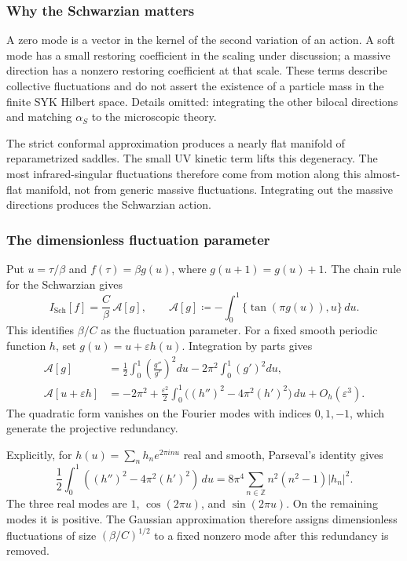 \documentclass[11pt]{article}
\numberwithin{equation}{section}
\theoremstyle{exposition}
\theoremstyle{result}
\newcommand{\Sch}{\mathrm{Sch}}
\begin{document}
\subsubsection{Why the Schwarzian matters}


A zero mode is a vector in the kernel of the second variation of an action. A soft mode has a small restoring coefficient in the scaling under discussion; a massive direction has a nonzero restoring coefficient at that scale. These terms describe collective fluctuations and do not assert the existence of a particle mass in the finite SYK Hilbert space. Details omitted: integrating the other bilocal directions and matching $\alpha_S$ to the microscopic theory.

The strict conformal approximation produces a nearly flat manifold of reparametrized saddles. The small UV kinetic term lifts this degeneracy. The most infrared-singular fluctuations therefore come from motion along this almost-flat manifold, not from generic massive fluctuations. Integrating out the massive directions produces the Schwarzian action.

\subsubsection{The dimensionless fluctuation parameter}
Put $u=\tau/\beta$ and $f(\tau)=\beta g(u)$, where $g(u+1)=g(u)+1$. The chain rule for the Schwarzian gives
\begin{equation}
I_{\Sch}[f]=\frac C\beta\,\mathcal A[g],
\qquad
\mathcal A[g]\coloneqq -\int_0^1\{\tan(\pi g(u)),u\}\,du.
\label{eq:SchRescaled}
\end{equation}
This identifies $\beta/C$ as the fluctuation parameter. For a fixed smooth periodic function $h$, set $g(u)=u+\varepsilon h(u)$. Integration by parts gives
\begin{align*}
\mathcal A[g]
&=\frac12\int_0^1\left(\frac{g''}{g'}\right)^2du
-2\pi^2\int_0^1(g')^2du,\\
\mathcal A[u+\varepsilon h]
&=-2\pi^2+\frac{\varepsilon^2}{2}
\int_0^1\bigl((h'')^2-4\pi^2(h')^2\bigr)\,du
+O_h(\varepsilon^3).
\end{align*}
The quadratic form vanishes on the Fourier modes with indices $0,1,-1$, which generate the projective redundancy.


Explicitly, for $h(u)=\sum_n h_ne^{2\pi inu}$ real and smooth, Parseval's identity gives
\begin{equation*}
\frac12\int_0^1((h'')^2-4\pi^2(h')^2)\,du
=8\pi^4\sum_{n\in\mathbb Z}n^2(n^2-1)|h_n|^2.
\end{equation*}
The three real modes are $1$, $\cos(2\pi u)$, and $\sin(2\pi u)$. On the remaining modes it is positive. The Gaussian approximation therefore assigns dimensionless fluctuations of size $(\beta/C)^{1/2}$ to a fixed nonzero mode after this redundancy is removed.
\end{document}
